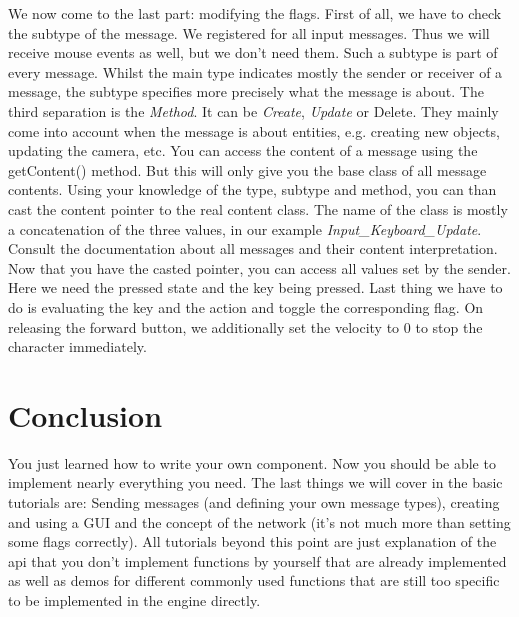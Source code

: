 \documentclass{article}
\begin{document}
We now come to the last part: modifying the flags. First of all, we have to check the subtype of the message. We registered for all input messages. Thus we will receive mouse events as well, but we don't need them. Such a subtype is part of every message. Whilst the main type indicates mostly the sender or receiver of a message, the subtype specifies more precisely what the message is about. The third separation is the \textit{Method}. It can be \textit{Create}, \textit{Update} or {Delete}. They mainly come into account when the message is about entities, e.g. creating new objects, updating the camera, etc. You can access the content of a message using the getContent() method. But this will only give you the base class of all message contents. Using your knowledge of the type, subtype and method, you can than cast the content pointer to the real content class. The name of the class is mostly a concatenation of the three values, in our example \textit{Input_Keyboard_Update}. Consult the documentation about all messages and their content interpretation. Now that you have the casted pointer, you can access all values set by the sender. Here we need the pressed state and the key being pressed. Last thing we have to do is evaluating the key and the action and toggle the corresponding flag. On releasing the forward button, we additionally set the velocity to 0 to stop the character immediately.


\section{Conclusion}

You just learned how to write your own component. Now you should be able to implement nearly everything you need. The last things we will cover in the basic tutorials are: Sending messages (and defining your own message types), creating and using a GUI and the concept of the network (it's not much more than setting some flags correctly). All tutorials beyond this point are just explanation of the api that you don't implement functions by yourself that are already implemented as well as demos for different commonly used functions that are still too specific to be implemented in the engine directly.
\end{document}
